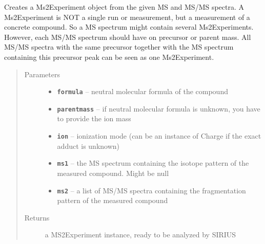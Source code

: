 \documentclass[letterpaper,10pt,openany,oneside]{sphinxmanual}
\begin{document}
\begin{fulllineitems}
\label{library:de.unijena.bioinf.sirius.getMs2Experiment(MolecularFormula, Ionization, Spectrum, Spectrum)}\label{library:de.unijena.bioinf.sirius.getMs2Experiment(double, Ionization, Spectrum, Spectrum)}
Creates a Ms2Experiment object from the given MS and MS/MS spectra. A Ms2Experiment is NOT a single run or measurement, but a measurement of a concrete compound. So a MS spectrum might contain several Ms2Experiments. However, each MS/MS spectrum should have on precursor or parent mass. All MS/MS spectra with the same precursor together with the MS spectrum containing this precursor peak can be seen as one Ms2Experiment.
\begin{quote}\begin{description}
\item[{Parameters}] \leavevmode\begin{itemize}
\item {} 
\textbf{\texttt{formula}} -- neutral molecular formula of the compound

\item {} 
\textbf{\texttt{parentmass}} -- if neutral molecular formula is unknown, you have to provide the ion mass

\item {} 
\textbf{\texttt{ion}} -- ionization mode (can be an instance of Charge if the exact adduct is unknown)

\item {} 
\textbf{\texttt{ms1}} -- the MS spectrum containing the isotope pattern of the measured compound. Might be null

\item {} 
\textbf{\texttt{ms2}} -- a list of MS/MS spectra containing the fragmentation pattern of the measured compound

\end{itemize}

\item[{Returns}] \leavevmode
a MS2Experiment instance, ready to be analyzed by SIRIUS

\end{description}\end{quote}

\end{fulllineitems}
\end{document}
